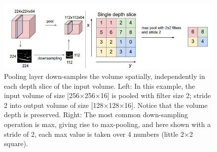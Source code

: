 \documentclass[authoryear,preprint,revi	ew,12pt]{elsarticle}
\begin{document}
\begin{centering}
	\begin{figure}
		\centering
		\includegraphics[width=\linewidth]{figures/maxpooling2.png}
		\caption{Pooling layer down-samples the volume spatially, independently in each depth slice of the input volume. Left: In this example, the input volume of size [256×256×16] is pooled with filter size 2; stride 2 into output volume of size [128×128×16]. Notice that the volume depth is preserved. Right: The most common down-sampling operation is max, giving rise to max-pooling, and here shown with a stride of 2, each max value is taken over 4 numbers (little 2×2 square).}
		\label{fig:maxpooling}
	\end{figure}
\end{centering}
\end{document}
